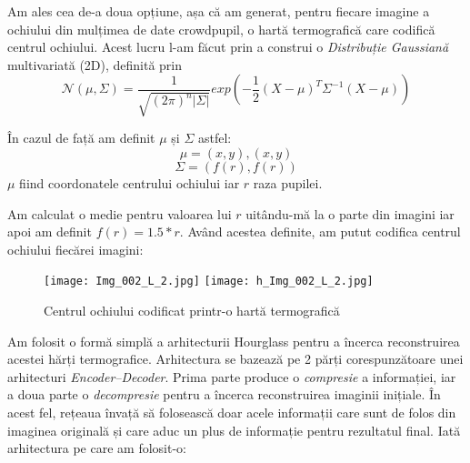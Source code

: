 Am ales cea de-a doua opțiune, așa că am generat, pentru fiecare imagine a ochiului din mulțimea de date crowdpupil, o hartă termografică care codifică centrul ochiului.
Acest lucru l-am făcut prin a construi o \emph{Distribuție Gaussiană} multivariată (2D), definită prin
$$\mathcal{N}(\mu, \Sigma) = \frac{1}{\sqrt{(2\pi)^{n}|\Sigma|}}exp(-\frac{1}{2}(X-\mu)^T\Sigma^{-1}(X-\mu))$$

În cazul de față am definit $\mu$ și $\Sigma$ astfel:
$$\mu = (x, y), (x, y)$$
$$\Sigma = (f(r), f(r))$$
$\mu$ fiind coordonatele centrului ochiului iar $r$ raza pupilei.

Am calculat o medie pentru valoarea lui $r$ uitându-mă la o parte din imagini iar apoi am definit $f(r) = 1.5 * r$.
Având acestea definite, am putut codifica centrul ochiului fiecărei imagini:

\begin{figure}[h]
    \centering
    \texttt{[image: Img\_002\_L\_2.jpg]}
    \texttt{[image: h\_Img\_002\_L\_2.jpg]}
    \caption{Centrul ochiului codificat printr-o hartă termografică}
\end{figure}

Am folosit o formă simplă a arhitecturii Hourglass pentru a încerca reconstruirea acestei hărți termografice.
Arhitectura se bazează pe 2 părți corespunzătoare unei arhitecturi \emph{Encoder–Decoder}.
Prima parte produce o \emph{compresie} a informației, iar a doua parte o \emph{decompresie} pentru a încerca reconstruirea imaginii inițiale.
În acest fel, rețeaua învață să folosească doar acele informații care sunt de folos din imaginea originală și care aduc un plus de informație pentru rezultatul final.
Iată arhitectura pe care am folosit-o:

